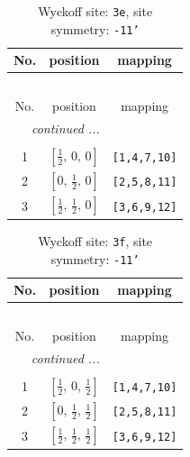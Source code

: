 \documentclass[fleqn,8pt]{jsarticle}
\begin{document}
\begin{longtable}{ccc}
\caption{Wyckoff site: {\tt 3e}, site symmetry: {\tt -11'}}
 \\
 \hline \hline
No. & position & mapping \\ \hline \endfirsthead

\multicolumn{2}{l}{\tablename\ \thetable{}} \\
 \hline \hline
No. & position & mapping \\ \hline \endhead

 \hline \hline
\multicolumn{2}{r}{\footnotesize\it continued ...} \\ \endfoot

 \hline \hline
\multicolumn{2}{r}{} \\ \endlastfoot

1 & $\left[ \frac{1}{2},\, 0,\, 0 \right]$ & {\tt [1,4,7,10]} \\ \hline
2 & $\left[ 0,\, \frac{1}{2},\, 0 \right]$ & {\tt [2,5,8,11]} \\ \hline
3 & $\left[ \frac{1}{2},\, \frac{1}{2},\, 0 \right]$ & {\tt [3,6,9,12]} \\
\end{longtable}
\renewcommand{\arraystretch}{1.2}
\begin{longtable}{ccc}
\caption{Wyckoff site: {\tt 3f}, site symmetry: {\tt -11'}}
 \\
 \hline \hline
No. & position & mapping \\ \hline \endfirsthead

\multicolumn{2}{l}{\tablename\ \thetable{}} \\
 \hline \hline
No. & position & mapping \\ \hline \endhead

 \hline \hline
\multicolumn{2}{r}{\footnotesize\it continued ...} \\ \endfoot

 \hline \hline
\multicolumn{2}{r}{} \\ \endlastfoot

1 & $\left[ \frac{1}{2},\, 0,\, \frac{1}{2} \right]$ & {\tt [1,4,7,10]} \\ \hline
2 & $\left[ 0,\, \frac{1}{2},\, \frac{1}{2} \right]$ & {\tt [2,5,8,11]} \\ \hline
3 & $\left[ \frac{1}{2},\, \frac{1}{2},\, \frac{1}{2} \right]$ & {\tt [3,6,9,12]} \\
\end{longtable}
\renewcommand{\arraystretch}{1.2}
\end{document}
